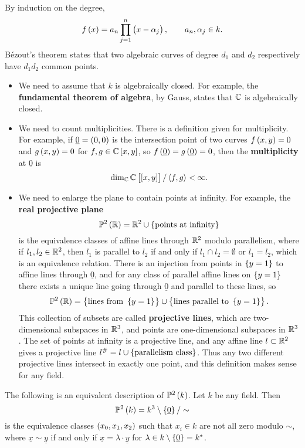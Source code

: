 By induction on the degree,
$$ f\br{x} = a_n\prod_{j = 1}^n \br{x - \alpha_j}, \qquad a_n, \alpha_j \in k. $$
B\'ezout's theorem states that two algebraic curves of degree $ d_1 $ and $ d_2 $ respectively have $ d_1d_2 $ common points.
\begin{itemize}
\item We need to assume that $ k $ is algebraically closed. For example, the \textbf{fundamental theorem of algebra}, by Gauss, states that $ \mathbb{C} $ is algebraically closed.
\item We need to count multiplicities. There is a definition given for multiplicity. For example, if $ \underline{0} = \br{0, 0} $ is the intersection point of two curves $ f\br{x, y} = 0 $ and $ g\br{x, y} = 0 $ for $ f, g \in \CC\sbr{x, y} $, so $ f\br{\underline{0}} = g\br{\underline{0}} = 0 $, then the \textbf{multiplicity} at $ \underline{0} $ is
$$ \dim_\CC \CC\sbr{\sbr{x, y}} / \abr{f, g} < \infty. $$
\item We need to enlarge the plane to contain points at infinity. For example, the \textbf{real projective plane}
$$ \PP^2\br{\RR} = \RR^2 \cup \cbr{\text{points at infinity}} $$
is the equivalence classes of affine lines through $ \mathbb{R}^2 $ modulo parallelism, where if $ l_1, l_2 \in \mathbb{R}^2 $, then $ l_1 $ is parallel to $ l_2 $ if and only if $ l_1 \cap l_2 = \emptyset $ or $ l_1 = l_2 $, which is an equivalence relation. There is an injection from points in $ \cbr{y = 1} $ to affine lines through $ \underline{0} $, and for any class of parallel affine lines on $ \cbr{y = 1} $ there exists a unique line going through $ \underline{0} $ and parallel to these lines, so
$$ \PP^2\br{\RR} = \cbr{\text{lines from} \ \cbr{y = 1}} \cup \cbr{\text{lines parallel to} \ \cbr{y = 1}}. $$
This collection of subsets are called \textbf{projective lines}, which are two-dimensional subspaces in $ \mathbb{R}^3 $, and points are one-dimensional subspaces in $ \mathbb{R}^3 $. The set of points at infinity is a projective line, and any affine line $ l \subset \mathbb{R}^2 $ gives a projective line $ l^\# = l \cup \cbr{\text{parallelism class}} $. Thus any two different projective lines intersect in exactly one point, and this definition makes sense for any field.
\end{itemize}

The following is an equivalent description of $ \PP^2\br{k} $. Let $ k $ be any field. Then
$$ \PP^2\br{k} = k^3 \setminus \cbr{\underline{0}} / \sim $$
is the equivalence classes $ \br{x_0, x_1, x_2} $ such that $ x_i \in k $ are not all zero modulo $ \sim $, where $ \underline{x} \sim \underline{y} $ if and only if $ \underline{x} = \lambda \cdot \underline{y} $ for $ \lambda \in k \setminus \cbr{\underline{0}} = k^* $.

